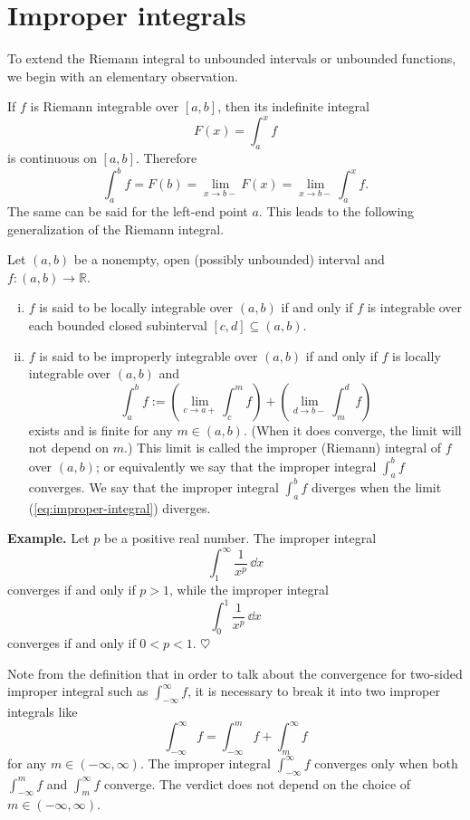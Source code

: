 \section{Improper integrals}
\label{sec:improper-integrals}

To extend the Riemann integral to unbounded intervals or unbounded functions, we begin with an elementary observation.

If $f$ is Riemann integrable over $[a,b]$, then its indefinite integral
\[
  F(x) = \int_a^x f
\]
is continuous on $[a,b]$.  Therefore
\[
  \int_a^b f = F(b) = \lim_{x \to b-} F(x) = \lim_{x \to b-} \int_a^x f.
\]
The same can be said for the left-end point $a$.
This leads to the following generalization of the Riemann integral.

\begin{defn}
  Let $(a,b)$ be a nonempty, open (possibly unbounded) interval and $f: (a,b) \to \mathbb{R}$.
  \begin{enumerate}[(i)]
    \item $f$ is said to be \textsf{locally integrable} over $(a,b)$ if and only if $f$ is integrable over each bounded closed subinterval $[c,d] \subseteq (a,b)$.

    \item $f$ is said to be \textsf{improperly integrable} over $(a,b)$ if and only if $f$ is locally integrable over $(a,b)$ and 
      \begin{equation}
	\label{eq:improper-integral}
	\int_a^b f := \left( \lim_{c \to a+} \int_c^m f \right) + \left( \lim_{d \to b-} \int_m^d f \right)
      \end{equation}
      exists and is finite for any $m \in (a,b)$.  (When it does converge, the limit will not depend on $m$.)
      This limit is called the \textsf{improper (Riemann) integral} of $f$ over $(a,b)$; or equivalently we say that the improper integral $\int_a^b f$ converges.  We say that the improper integral $\int_a^b f$ diverges when the limit (\ref{eq:improper-integral}) diverges.
  \end{enumerate}
\end{defn}

\medskip
\noindent\textbf{Example.} Let $p$ be a positive real number.
The improper integral
\[
  \int_1^\infty \frac{1}{x^p} \, \dd x
\]
converges if and only if $p > 1$, while the improper integral
\[
  \int_0^1 \frac{1}{x^p} \, \dd x
\]
converges if and only if $0 < p < 1$. \hfill$\heartsuit$

Note from the definition that in order to talk about the convergence for two-sided improper integral such as $\int_{-\infty}^\infty f$, it is necessary to break it into two improper integrals like
\[
  \int_{-\infty}^\infty f = \int_{-\infty}^m f + \int_m^\infty f
\]
for any $m \in (-\infty, \infty)$.
The improper integral $\int_{-\infty}^\infty f$ converges only when both $\int_{-\infty}^m f$ and $\int_m^\infty f$ converge.
The verdict does not depend on the choice of $m \in (-\infty, \infty)$.

